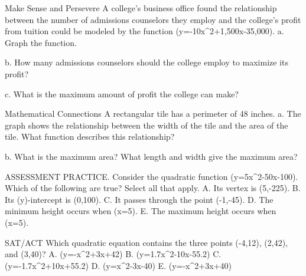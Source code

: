 \documentclass{article}
\newenvironment{practice}[2]{}{}        %
\newcommand{\answer}[1]{}               %
\newcommand{\placeholder}[2]{}          %
\begin{document}
\begin{practice}{26}{3}
Make Sense and Persevere A college's business office found the relationship between the number of admissions counselors they employ and the college's profit from tuition could be modeled by the function (y=-10x^2+1,500x-35,000).
a. Graph the function.
\answer{a. See graph.}
\placeholder{graph}{Answer 26a: blue downward parabola (y=-10x^2+1500x-35000), vertex (75,21250), (y)-intercept (0,-35000), both lower ends arrowed. Black arrowed (x),(y) axes, origin O. Window (x) [-50,200], (y) [-60000,40000], grid spacing 25 horizontally and 10000 vertically. Labeled (x) ticks 50,100,150; (y) ticks -40000,-20000,20000.}
b. How many admissions counselors should the college employ to maximize its profit?
\answer{b. 75 admission counselors}
c. What is the maximum amount of profit the college can make?
\answer{c. \$21,250}
\end{practice}
\begin{practice}{27}{3}
Mathematical Connections A rectangular tile has a perimeter of 48 inches.
a. The graph shows the relationship between the width of the tile and the area of the tile. What function describes this relationship?
\placeholder{graph}{First-quadrant red downward parabola from (0,0) through vertex (12,144) to (24,0), downward arrow at right end. Horizontal axis (x), Width (in.), numbered 0,6,12,18,24 with grid spacing 3; vertical (y), Area (in.^2), labels 0,40,80,120,160 with grid spacing 20. Window (x) 0 to 27 and (y) 0 to 160. Axes arrowed.}
\answer{a. Equation of the parabola: (y=-x^2+24x). Vertex form: (y=-(x-12)^2+144). Intercept form: (y=-x(x-24)).}
b. What is the maximum area? What length and width give the maximum area?
\answer{b. maximum area: 144 sq. in.; length: 12; width: 12}
\end{practice}
\begin{practice}{28}{2}
ASSESSMENT PRACTICE. Consider the quadratic function (y=5x^2-50x-100). Which of the following are true? Select all that apply.
A. Its vertex is (5,-225).
B. Its (y)-intercept is (0,100).
C. It passes through the point (-1,-45).
D. The minimum height occurs when (x=5).
E. The maximum height occurs when (x=5).
\answer{A, C, D}
\end{practice}
\begin{practice}{29}{2}
SAT/ACT Which quadratic equation contains the three points (-4,12), (2,42), and (3,40)?
A. (y=-x^2+3x+42)
B. (y=1.7x^2-10x-55.2)
C. (y=-1.7x^2+10x+55.2)
D. (y=x^2-3x-40)
E. (y=-x^2+3x+40)
\answer{E}
\end{practice}
\end{document}
